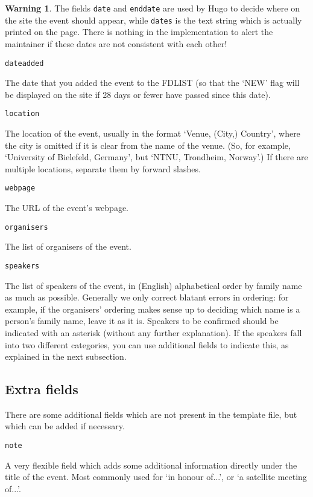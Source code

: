 \documentclass[12pt]{scrartcl}
\theoremstyle{definition}
\newtheorem*{warn}{Warning}
\begin{document}
\begin{warn}
The fields \verb|date| and \verb|enddate| are used by Hugo to decide where on the site the event should appear, while \verb|dates| is the text string which is actually printed on the page.
There is nothing in the implementation to alert the maintainer if these dates are not consistent with each other!
\end{warn}

\noindent\verb|dateadded|\nopagebreak

The date that you added the event to the FDLIST (so that the `NEW' flag will be displayed on the site if 28 days or fewer have passed since this date).
\medskip

\noindent\verb|location|\nopagebreak

The location of the event, usually in the format `Venue, (City,) Country', where the city is omitted if it is clear from the name of the venue.
(So, for example, `University of Bielefeld, Germany', but `NTNU, Trondheim, Norway'.)
If there are multiple locations, separate them by forward slashes.
\medskip

\noindent\verb|webpage|\nopagebreak

The URL of the event's webpage.
\medskip

\noindent\verb|organisers|\nopagebreak

The list of organisers of the event.
\medskip

\noindent\verb|speakers|\nopagebreak

The list of speakers of the event, in (English) alphabetical order by family name as much as possible. Generally we only correct blatant errors in ordering: for example, if the organisers' ordering makes sense up to deciding which name is a person's family name, leave it as it is.
Speakers to be confirmed should be indicated with an asterisk (without any further explanation). If the speakers fall into two different categories, you can use additional fields to indicate this, as explained in the next subsection.

\subsection{Extra fields}

There are some additional fields which are not present in the template file, but which can be added if necessary.
\medskip

\noindent\verb|note|\nopagebreak

A very flexible field which adds some additional information directly under the title of the event.
Most commonly used for `in honour of...', or `a satellite meeting of...'.
\medskip
\end{document}
